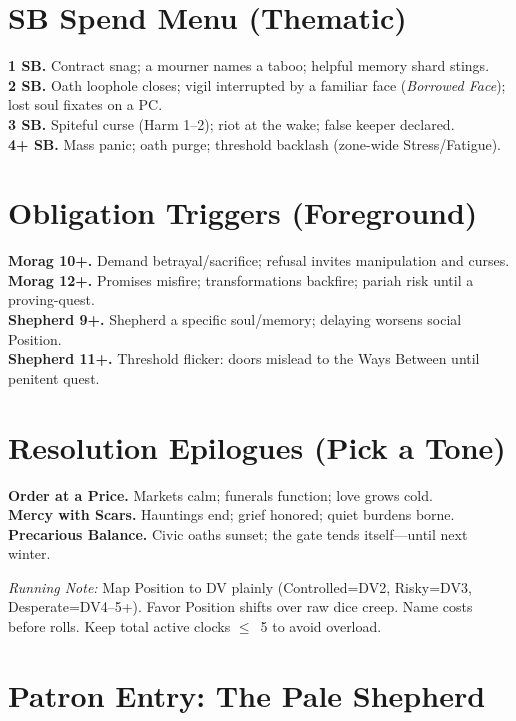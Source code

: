 \documentclass[11pt]{article}
\begin{document}
\section*{SB Spend Menu (Thematic)}
\textbf{1 SB.} Contract snag; a mourner names a taboo; helpful memory shard stings.\\
\textbf{2 SB.} Oath loophole closes; vigil interrupted by a familiar face (\textit{Borrowed Face}); lost soul fixates on a PC.\\
\textbf{3 SB.} Spiteful curse (Harm 1--2); riot at the wake; false keeper declared.\\
\textbf{4+ SB.} Mass panic; oath purge; threshold backlash (zone-wide Stress/Fatigue).

\section*{Obligation Triggers (Foreground)}
\textbf{Morag 10+.} Demand betrayal/sacrifice; refusal invites manipulation and curses.\\
\textbf{Morag 12+.} Promises misfire; transformations backfire; pariah risk until a proving-quest.\\
\textbf{Shepherd 9+.} Shepherd a specific soul/memory; delaying worsens social Position.\\
\textbf{Shepherd 11+.} Threshold flicker: doors mislead to the Ways Between until penitent quest.

\section*{Resolution Epilogues (Pick a Tone)}
\textbf{Order at a Price.} Markets calm; funerals function; love grows cold.\\
\textbf{Mercy with Scars.} Hauntings end; grief honored; quiet burdens borne.\\
\textbf{Precarious Balance.} Civic oaths sunset; the gate tends itself---until next winter.

\vfill
\noindent\footnotesize\textit{Running Note:} Map Position to DV plainly (Controlled=DV2, Risky=DV3, Desperate=DV4--5+). Favor Position shifts over raw dice creep. Name costs before rolls. Keep total active clocks $\leq$~5 to avoid overload.

\appendix

\clearpage
\section{Patron Entry: The Pale Shepherd}
\label{patron:pale-shepherd}
\end{document}
